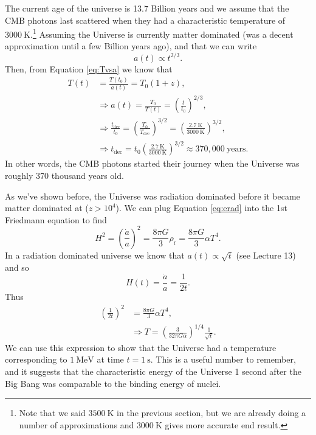 \documentclass[a4paper,12pt]{article}
\theoremstyle{remark}
\newcommand{\mrm}[1]{\mathrm{#1}}
\renewcommand{\=}[1]{\stackrel{#1}{=}} %
\theoremstyle{plain}
\theoremstyle{definition}
\begin{document}
The current age of the universe is 13.7 Billion years and we assume that the CMB photons last scattered when they had a characteristic temperature of $3000 \:\mrm{K}$.\footnote{Note that we said $3500 \:\mrm{K}$ in the previous section, but we are already doing a number of approximations and $3000 \:\mrm{K}$ gives more accurate end result.} Assuming the Universe is currently matter dominated (was a decent approximation until a few Billion years ago), and that we can write 
\begin{equation}
a(t) \propto t^{2/3}.
\end{equation}
Then, from Equation \ref{eq:Tvsa} we know that 
\begin{align}
T(t) &= \frac{T(t_0)}{a(t)} = T_0 (1+z), \nonumber \\
& \Rightarrow a(t) = \frac{T_0}{T(t)} = \left( \frac{t}{t_0} \right)^{2/3}, \nonumber \\
& \Rightarrow \frac{t_\mrm{dec}}{t_0} = \left( \frac{T_0}{T_\mrm{dec}} \right) ^{3/2} = \left( \frac{2.7 \:\mrm{K}}{3000  \:\mrm{K}} \right) ^{3/2}, \nonumber \\ 
& \Rightarrow t_\mrm{dec} = t_0 \left( \frac{2.7 \:\mrm{K}}{3000  \:\mrm{K}} \right) ^{3/2} \approx 370,000 \:\mrm{years}.
\end{align}
In other words, the CMB photons started their journey when the Universe was roughly 370 thousand years old.



As we've shown before, the Universe was radiation dominated before it became matter dominated at ($z > 10^4$). We can plug Equation \ref{eq:erad} into the 1st Friedmann equation to find 
\begin{equation}
H^2 = \left( \frac{\dot{a}}{a} \right) ^2 = \frac{8\pi G}{3} \rho _\mrm{r} = \frac{8\pi G}{3} \alpha T^4.
\end{equation}
In a radiation dominated universe we know that $a(t) \propto \sqrt{t}$ (see Lecture 13) and so 
\begin{equation}
H(t) = \frac{\dot{a}}{a} = \frac{1}{2t}.
\end{equation}
Thus 
\begin{align}
\left( \frac{1}{2t} \right) ^2 &= \frac{8\pi G}{3} \alpha T^4, \nonumber \\
& \Rightarrow T = \left( \frac{3}{32 \pi G \alpha} \right)^{1/4} \frac{1}{\sqrt{t}}.
\end{align}
We can use this expression to show that the Universe had a temperature corresponding to $1 \:\mrm{MeV}$ at time $t = 1 \:\mrm{s}$. This is a useful number to remember, and it suggests that the characteristic energy of the Universe 1 second after the Big Bang was comparable to the binding energy of nuclei. 
\end{document}

